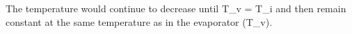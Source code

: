 The temperature would continue to decrease until T_v = T_i and then remain constant at the same temperature as in the evaporator (T_v).
